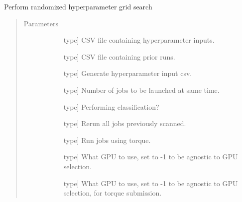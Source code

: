 \documentclass[letterpaper,10pt,english]{sphinxmanual}
\begin{document}
\begin{fulllineitems}
\label{\detokenize{index:methylnet.hyperparameter_scans.coarse_scan}}
Perform randomized hyperparameter grid search
\begin{quote}\begin{description}
\item[{Parameters}] \leavevmode\begin{description}
\item[{}] \leavevmode{[}type{]}
CSV file containing hyperparameter inputs.

\item[{}] \leavevmode{[}type{]}
CSV file containing prior runs.

\item[{}] \leavevmode{[}type{]}
Generate hyperparameter input csv.

\item[{}] \leavevmode{[}type{]}
Number of jobs to be launched at same time.

\item[{}] \leavevmode{[}type{]}
Performing classification?

\item[{}] \leavevmode{[}type{]}
Rerun all jobs previously scanned.

\item[{}] \leavevmode{[}type{]}
Run jobs using torque.

\item[{}] \leavevmode{[}type{]}
What GPU to use, set to -1 to be agnostic to GPU selection.

\item[{}] \leavevmode{[}type{]}
What GPU to use, set to -1 to be agnostic to GPU selection, for torque submission.


\end{description}
\end{description}
\end{quote}
\end{fulllineitems}
\end{document}
